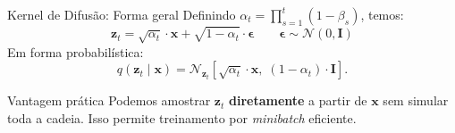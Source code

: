 \documentclass[aspectratio=169,xcolor=dvipsnames]{beamer}
\begin{document}
  \begin{frame}{Kernel de Difusão: Forma geral}
    Definindo $\alpha_t = \prod_{s=1}^{t}(1 - \beta_s)$, temos:
    \vspace{0.3em}
    \[
      \boxed{\mathbf{z}_t = \sqrt{\alpha_t}\cdot \mathbf{x} + \sqrt{1 - \alpha_t}\cdot \boldsymbol{\epsilon}}
      \qquad \boldsymbol{\epsilon} \sim \mathcal{N}(0,\mathbf{I})
    \]
    \vspace{0.3em}
    Em forma probabilística:
    \[
      q(\mathbf{z}_t \mid \mathbf{x}) = \mathcal{N}_{\mathbf{z}_t}\!\left[\sqrt{\alpha_t}\cdot \mathbf{x},\; (1 - \alpha_t)\cdot \mathbf{I}\right].
    \]
    \begin{block}{Vantagem prática}
      Podemos amostrar $\mathbf{z}_t$ \textbf{diretamente} a partir de $\mathbf{x}$ sem
      simular toda a cadeia. Isso permite treinamento por
      \textit{minibatch} eficiente.
    \end{block}
  \end{frame}
\end{document}
